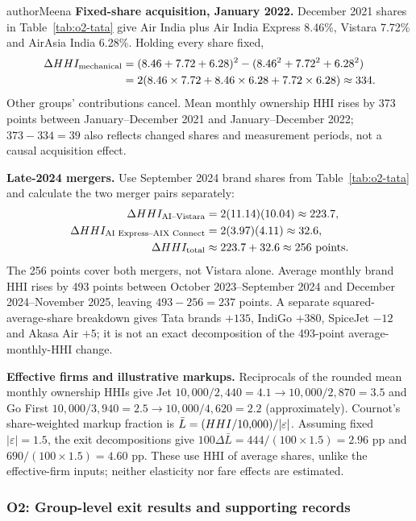 \begin{mergedcontribution}{authorMeena}
\textbf{Fixed-share acquisition, January 2022.} December 2021 shares in Table~\ref{tab:o2-tata} give Air India plus Air India Express 8.46\%, Vistara 7.72\% and AirAsia India 6.28\%. Holding every share fixed,
\[
\begin{aligned}
\Delta HHI_{\mathrm{mechanical}}
&=(8.46+7.72+6.28)^2-(8.46^2+7.72^2+6.28^2)\\
&=2(8.46\times7.72+8.46\times6.28+7.72\times6.28)\approx334.
\end{aligned}
\]
Other groups' contributions cancel. Mean monthly ownership HHI rises by 373 points between January--December 2021 and January--December 2022; $373-334=39$ also reflects changed shares and measurement periods, not a causal acquisition effect.

\textbf{Late-2024 mergers.} Use September 2024 brand shares from Table~\ref{tab:o2-tata} and calculate the two merger pairs separately:
\[
\begin{aligned}
\Delta HHI_{\text{AI--Vistara}} &= 2(11.14)(10.04) \approx 223.7,\\
\Delta HHI_{\text{AI Express--AIX Connect}} &= 2(3.97)(4.11) \approx 32.6,\\
\Delta HHI_{\text{total}} &\approx 223.7+32.6 \approx 256\text{ points}.
\end{aligned}
\]
The 256 points cover both mergers, not Vistara alone. Average monthly brand HHI rises by 493 points between October 2023--September 2024 and December 2024--November 2025, leaving $493-256=237$ points. A separate squared-average-share breakdown gives Tata brands $+135$, IndiGo $+380$, SpiceJet $-12$ and Akasa Air $+5$; it is not an exact decomposition of the 493-point average-monthly-HHI change.

\textbf{Effective firms and illustrative markups.} Reciprocals of the rounded mean monthly ownership HHIs give Jet $10{,}000/2{,}440=4.1\to10{,}000/2{,}870=3.5$ and Go First $10{,}000/3{,}940=2.5\to10{,}000/4{,}620=2.2$ (approximately). Cournot's share-weighted markup fraction is $\bar L=(HHI/10{,}000)/|\varepsilon|$. Assuming fixed $|\varepsilon|=1.5$, the exit decompositions give $100\Delta\bar L=444/(100\times1.5)=2.96$ pp and $690/(100\times1.5)=4.60$ pp. These use HHI of average shares, unlike the effective-firm inputs; neither elasticity nor fare effects are estimated.

\subsubsection{O2: Group-level exit results and supporting records}


\end{mergedcontribution}

